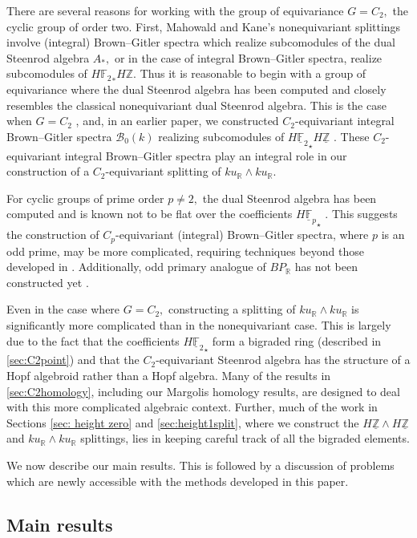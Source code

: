 \documentclass{amsart}
\theoremstyle{plain}
\numberwithin{equation}{section}
\numberwithin{figure}{section}
\newcommand{\mF}{{\mathbb F}}
\newcommand{\mR}{{\mathbb R}}
\newcommand{\mZ}{{\mathbb Z}}
\newcommand{\cB}{{\mathcal B}}
\newcommand{\umF}{\underline{\mF}}
\newcommand{\umZ}{\underline{\mZ}}
\newcommand{\0}{\langle 0 \rangle }
\begin{document}
There are several reasons for working with the group of equivariance $G = C_2,$ the cyclic group of order two. First, Mahowald and Kane's nonequivariant splittings involve (integral) Brown--Gitler spectra which realize subcomodules of the dual Steenrod algebra $A_{*},$ or in the case of integral Brown--Gitler spectra, realize subcomodules of $H {\mF_2}_{*}H\mathbb{Z}$. Thus it is reasonable to begin with a group of equivariance where the dual Steenrod algebra has been computed and closely resembles the classical nonequivariant dual Steenrod algebra. This is the case when $G = C_2$ \cite[Theorem~6.41]{HuKriz2001}, and, in an earlier paper, we constructed $C_2$-equivariant integral Brown--Gitler spectra $\cB_0(k)$ realizing subcomodules of $H {\umF_2}_\star H \umZ$ \cite{LiPetersenTatum23}. These $C_2$-equivariant integral Brown--Gitler spectra play an integral role in our construction of a $C_2$-equivariant splitting of $ku_\mR \wedge ku_\mR$.

For cyclic groups of prime order $p \neq 2,$ the dual Steenrod algebra has been computed and is known not to be flat over the coefficients $H {\umF_p}_\star$ \cite{SanW2il022,KuKrizSomberZou23}. This suggests the construction of $C_p$-equivariant (integral) Brown--Gitler spectra, where $p$ is an odd prime, may be more complicated, requiring techniques beyond those developed in \cite{LiPetersenTatum23}. Additionally, odd primary analogue of $BP_\mR$ has not been constructed yet \cite{HHR2011,HahnSengerWilson23}.

Even in the case where $G = C_2,$ constructing a splitting of $ku_\mR \wedge ku_\mR$ is significantly more complicated than in the nonequivariant case. This is largely due to the fact that the coefficients $H {\umF_2}_\star$ form a bigraded ring (described in \cref{sec:C2point}) and that the $C_2$-equivariant Steenrod algebra has the structure of a Hopf algebroid rather than a Hopf algebra. Many of the results in \cref{sec:C2homology}, including our Margolis homology results, are designed to deal with this more complicated algebraic context. Further, much of the work in Sections \ref{sec: height zero} and \ref{sec:height1split}, where we construct the $H \umZ \wedge H \umZ$ and $ku_\mR \wedge ku_\mR$ splittings, lies in keeping careful track of all the bigraded elements. 

We now describe our main results. This is followed by a discussion of problems which are newly accessible with the methods developed in this paper. 

\subsection{Main results} 
\end{document}
